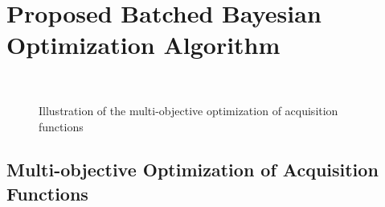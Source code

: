 \section{Proposed Batched Bayesian Optimization Algorithm}

\begin{figure}[tp!]
    \centering
    ~
    \caption{Illustration of the multi-objective optimization of acquisition functions}
    \label{fig:PF_example}
\end{figure}

\subsection{Multi-objective Optimization of Acquisition Functions}\label{sec:MOForumlation}

